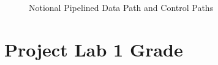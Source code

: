 \documentclass{article}
\begin{document}
\begin{figure}[!htbp]
  \centering
  \caption{Notional Pipelined Data Path and Control Paths}
  \label{fig:data_control_paths}
\end{figure}
\newpage

\section{Project Lab 1 Grade}
\end{document}
